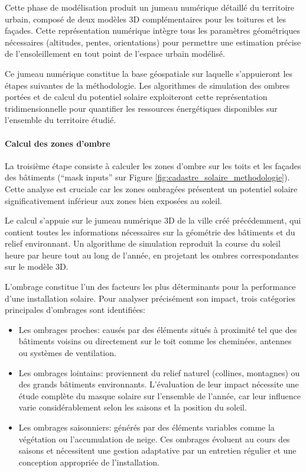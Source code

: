 Cette phase de modélisation produit un jumeau numérique détaillé du territoire urbain, composé de deux modèles 3D complémentaires pour les toitures et les façades. Cette représentation numérique intègre tous les paramètres géométriques nécessaires (altitudes, pentes, orientations) pour permettre une estimation précise de l'ensoleillement en tout point de l'espace urbain modélisé.

Ce jumeau numérique constitue la base géospatiale sur laquelle s'appuieront les étapes suivantes de la méthodologie. Les algorithmes de simulation des ombres portées et de calcul du potentiel solaire exploiteront cette représentation tridimensionnelle pour quantifier les ressources énergétiques disponibles sur l'ensemble du territoire étudié.

\paragraph{Calcul des zones d'ombre}

La troisième étape consiste à calculer les zones d'ombre sur les toits et les façades des bâtiments (``mask inputs'' sur Figure \ref{fig:cadastre_solaire_methodologie}). Cette analyse est cruciale car les zones ombragées présentent un potentiel solaire significativement inférieur aux zones bien exposées au soleil.

Le calcul s'appuie sur le jumeau numérique 3D de la ville créé précédemment, qui contient toutes les informations nécessaires sur la géométrie des bâtiments et du relief environnant. Un algorithme de simulation reproduit la course du soleil heure par heure tout au long de l'année, en projetant les ombres correspondantes sur le modèle 3D.

L'ombrage constitue l'un des facteurs les plus déterminants pour la performance d'une installation solaire. Pour analyser précisément son impact, trois catégories principales d'ombrages sont identifiées:

\begin{itemize}
    \item Les ombrages proches: causés par des éléments situés à proximité tel que des bâtiments voisins ou directement sur le toit comme les cheminées, antennes ou systèmes de ventilation.
    \item Les ombrages lointains: proviennent du relief naturel (collines, montagnes) ou des grands bâtiments environnants. L'évaluation de leur impact nécessite une étude complète du masque solaire sur l'ensemble de l'année, car leur influence varie considérablement selon les saisons et la position du soleil.
    \item Les ombrages saisonniers: générés par des éléments variables comme la végétation ou l'accumulation de neige. Ces ombrages évoluent au cours des saisons et nécessitent une gestion adaptative par un entretien régulier et une conception appropriée de l'installation.
\end{itemize}

